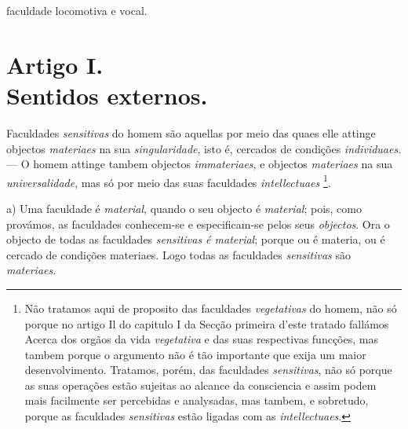 faculdade locomotiva e vocal.


\section*{Artigo I.\\ Sentidos externos.}


Faculdades \emph{sensitivas} do homem são aquellas por meio das quaes elle attinge objectos \emph{materiaes} na sua \emph{singularidade}, isto é, cercados de condições   \emph{individuaes}. --- O homem attinge tambem objectos \emph{immateriaes}, e objectos \emph{materiaes} na sua \emph{universalidade}, mas só por meio das suas faculdades \emph{intellectuaes} \footnote{Não tratamos aqui de proposito das faculdades \emph{vegetativas} do homem, não só porque no artigo Il do capitulo I da Secção primeira d'este tratado fallámos Acerca dos orgãos da vida \emph{vegetativa} e das suas respectivas funcções, mas tambem porque o argumento não é tão importante que exija um maior desenvolvimento. Tratamos, porém, das faculdades \emph{sensitivas}, não só porque as suas operações estão sujeitas ao alcance da consciencia e assim podem mais facilmente ser percebidas e analysadas, mas tambem, e sobretudo, porque as faculdades \emph{sensitivas} estão ligadas com as \emph{intellectuaes}.}.



a) Uma faculdade é \emph{material}, quando o seu objecto é \emph{material}; pois, como provámos, as faculdades conhecem-se e especificam-se pelos seus \emph{objectos}. Ora o objecto de todas as faculdades \emph{sensitivas é material}; porque ou é materia, ou é cercado de condições materiaes. Logo todas as faculdades \emph{sensitivas} são \emph{materiaes}.

